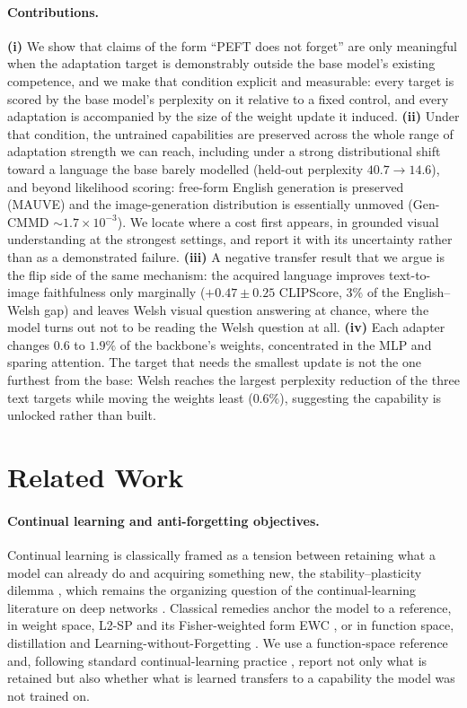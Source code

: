 \documentclass{article}
\begin{document}
\paragraph{Contributions.}
\textbf{(i)} We show that claims of the form ``PEFT does not forget'' are only
meaningful when the adaptation target is demonstrably outside the base model's
existing competence, and we make that condition explicit and measurable: every
target is scored by the base model's perplexity on it relative to a fixed
control, and every adaptation is accompanied by the size of the weight update it
induced.
\textbf{(ii)} Under that condition, the untrained capabilities are preserved
across the whole range of adaptation strength we can reach, including under a
strong distributional shift toward a language the base barely modelled (held-out
perplexity $40.7\to14.6$), and beyond likelihood scoring: free-form English
generation is preserved (MAUVE) and the image-generation distribution is
essentially unmoved (Gen-CMMD $\sim\!1.7\times10^{-3}$). We locate where a cost
first appears, in grounded visual understanding at the strongest settings, and
report it with its uncertainty rather than as a demonstrated failure.
\textbf{(iii)} A negative transfer result that we argue is the flip side of the
same mechanism: the acquired language improves text-to-image faithfulness only
marginally ($+0.47\pm0.25$ CLIPScore, $3\%$ of the English--Welsh gap) and leaves
Welsh visual question answering at chance, where the model turns out not to be
reading the Welsh question at all.
\textbf{(iv)} Each adapter changes $0.6$ to $1.9\%$ of the backbone's weights,
concentrated in the MLP and sparing attention. The target that needs the smallest
update is not the one furthest from the base: Welsh reaches the largest
perplexity reduction of the three text targets while moving the weights least
($0.6\%$), suggesting the capability is unlocked rather than built.

\section{Related Work}
\paragraph{Continual learning and anti-forgetting objectives.}
Continual learning is classically framed as a tension between retaining what a
model can already do and acquiring something new, the stability--plasticity
dilemma \citep{mermillod2013stability}, which remains the organizing question of
the continual-learning literature on deep networks \citep{wang2024clsurvey}.
Classical remedies anchor the model to a reference, in weight space, L2-SP
\citep{xuhong2018l2sp} and its Fisher-weighted form EWC \citep{kirkpatrick2017ewc},
or in function space, distillation \citep{hinton2015distilling} and
Learning-without-Forgetting \citep{li2017lwf}. We use a function-space reference
and, following standard continual-learning practice \citep{lopezpaz2017gem},
report not only what is retained but also whether what is learned transfers to a
capability the model was not trained on.
\end{document}
